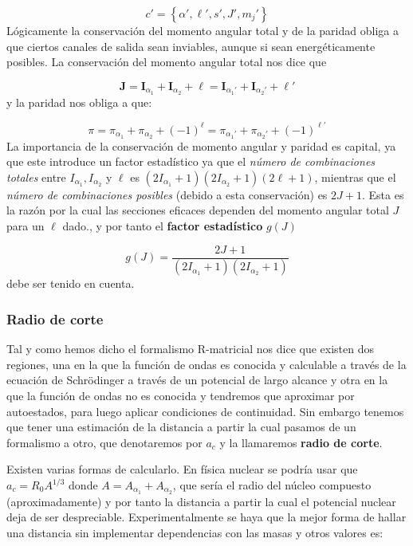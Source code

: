 \documentclass[fleqn,10pt]{SelfArx} %
\newcommand{\In}{\mathbf{I}}
\newcommand{\Jn}{\mathbf{J}}
\begin{document}
\begin{equation}
	c' = \left\lbrace \alpha',\ell',s',J',m_j' \right\rbrace
\end{equation}
Lógicamente la conservación del momento angular total y de la paridad obliga a que ciertos canales de salida sean inviables, aunque si sean energéticamente posibles. La conservación del momento angular total nos dice que

\begin{equation}
	\Jn = \In_{\alpha_1}+\In_{\alpha_2}+\ell =  \In_{\alpha_1'}+\In_{\alpha_2'}+\ell' 
\end{equation}
y la paridad nos obliga a que:

\begin{equation}
	\pi = \pi_{\alpha_1}+\pi_{\alpha_2}+(-1)^{\ell} =  \pi_{\alpha_1'}+ \pi_{\alpha_2'} +(-1)^{\ell'} 
\end{equation}
La importancia de la conservación de momento angular y paridad es capital, ya que este introduce un factor estadístico ya que el \textit{número de combinaciones totales} entre $I_{\alpha_1}, I_{\alpha_2}$ y $\ell$ es $(2I_{\alpha_1}+1)(2I_{\alpha_2}+1)(2\ell+1)$, mientras que el \textit{número de combinaciones posibles} (debido a esta conservación) es $2J+1$. Esta es la razón por la cual las secciones eficaces dependen del momento angular total $J$ para un $\ell$ dado., y por tanto el \textbf{factor estadístico} $g(J)$

\begin{equation}
	g(J)=\frac{2J+1}{(2I_{\alpha_1}+1)(2I_{\alpha_2}+1)}
\end{equation}
debe ser tenido en cuenta.

\subsubsection{Radio de corte}

Tal y como hemos dicho el formalismo R-matricial nos dice que existen dos regiones, una en la que la función de ondas es conocida y calculable a través de la ecuación de Schrödinger a través de un potencial de largo alcance y otra en la que la función de ondas no es conocida y tendremos que aproximar por autoestados, para luego aplicar condiciones de continuidad. Sin embargo tenemos que tener una estimación de la distancia a partir la cual pasamos de un formalismo a otro, que denotaremos por $a_c$ y la llamaremos \textbf{radio de corte}. 

Existen varias formas de calcularlo. En física nuclear se podría usar que $a_c=R_0 A^{1/3}$ donde $A=A_{\alpha_1}+A_{\alpha_2}$, que sería el radio del núcleo compuesto (aproximadamente) y por tanto la distancia a partir la cual el potencial nuclear deja de ser despreciable. Experimentalmente se haya que la mejor forma de hallar una distancia sin implementar dependencias con las masas y otros valores es:
\end{document}
